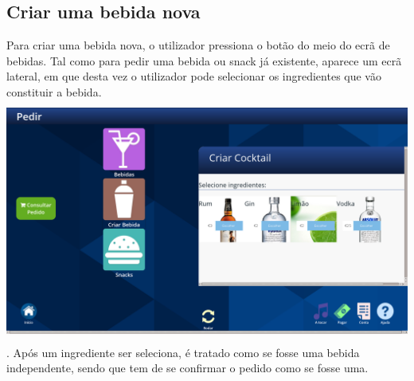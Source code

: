 \documentclass{article}
\begin{document}
\subsection{Criar uma bebida nova}
Para criar uma bebida nova, o utilizador pressiona o botão do meio do ecrã de bebidas. Tal como para pedir uma bebida ou snack já existente, aparece um ecrã lateral, em que desta vez o utilizador pode selecionar os ingredientes que vão constituir a bebida.\\
\includegraphics[width=15cm, height=8cm]{user_manual_images/create_submenu.png}.
Após um ingrediente ser seleciona, é tratado como se fosse uma bebida independente, sendo que tem de se confirmar o pedido como se fosse uma.
\end{document}
